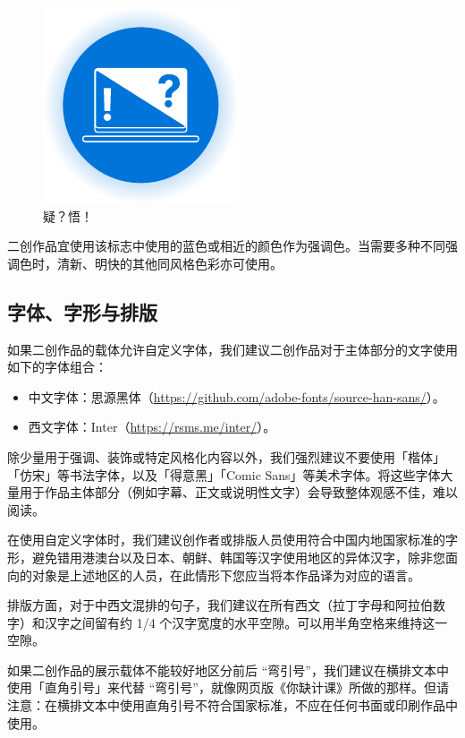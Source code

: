 \begin{figure}[htb!]
  \centering
  \includegraphics[width=.45\textwidth]{assets/missing_logo.pdf}
  \caption{疑？悟！}
  \label{fig:missing_logo}
\end{figure}

二创作品宜使用该标志中使用的蓝色或相近的颜色作为强调色。当需要多种不同强调色时，清新、明快的其他同风格色彩亦可使用。

\subsection{字体、字形与排版}

如果二创作品的载体允许自定义字体，我们建议二创作品对于主体部分的文字使用如下的字体组合：
\begin{itemize}
  \item 中文字体：思源黑体（\url{https://github.com/adobe-fonts/source-han-sans/}）。
  \item 西文字体：Inter（\url{https://rsms.me/inter/}）。
\end{itemize}

除少量用于强调、装饰或特定风格化内容以外，我们强烈建议不要使用「楷体」「仿宋」等书法字体，以及「得意黑」「Comic Sans」等美术字体。将这些字体大量用于作品主体部分（例如字幕、正文或说明性文字）会导致整体观感不佳，难以阅读。

在使用自定义字体时，我们建议创作者或排版人员使用符合中国内地国家标准的字形，避免错用港澳台以及日本、朝鲜、韩国等汉字使用地区的异体汉字，除非您面向的对象是上述地区的人员，在此情形下您应当将本作品译为对应的语言。

排版方面，对于中西文混排的句子，我们建议在所有西文（拉丁字母和阿拉伯数字）和汉字之间留有约 1/4 个汉字宽度的水平空隙。可以用半角空格来维持这一空隙。

如果二创作品的展示载体不能较好地区分前后 “弯引号”，我们建议在横排文本中使用「直角引号」来代替 “弯引号”，就像网页版《你缺计课》所做的那样。但请注意：在横排文本中使用直角引号不符合国家标准，不应在任何书面或印刷作品中使用。

